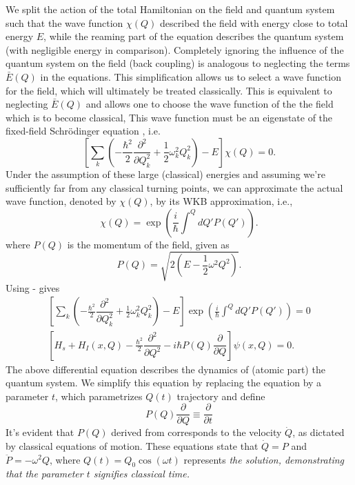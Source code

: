 We split the action of the total Hamiltonian on the field and quantum system such that the 
wave function \(\chi(Q)\) described the field with energy close to total energy \(E\), while 
the reaming part of the equation describes the quantum system (with negligible energy in comparison).
Completely ignoring the influence of the quantum system on the field (back coupling) is analogous 
to neglecting the terms \(\bar{E}(Q)\) in the equations. This simplification allows us 
to select a wave function for the field, which will ultimately be treated classically. 
This is equivalent to neglecting \(\bar{E}(Q)\) and allows one to choose the wave function of the
the field which is to become classical, This wave function must be an eigenstate of the fixed-field Schrödinger equation
, i.e.
\begin{equation}
    \label{eq:class_jcm_eq10}
    \left[\sum_k \left(-\frac{\hbar^2}{2}\dfrac{\partial^2}{\partial Q_k^2}
    + \frac{1}{2} \omega_k^2 Q_k^2\right)
    - E \right]\chi(Q) = 0.
\end{equation}
Under the assumption of these large (classical) energies and assuming we're sufficiently far from any 
classical turning points, we can approximate the actual wave function, denoted by $\chi(Q)$,
 by its WKB approximation, i.e., 
 \begin{equation}
    \label{eq:class_jcm_eq11}
    \chi(Q) = \exp\left(\frac{i}{\hbar}\int ^Q dQ' P(Q')\right).
 \end{equation}
where \(P(Q)\) is the momentum of the field, given as 
\begin{equation}
    \label{eq:class_jcm_eq12}
    P(Q) = \sqrt{2\left(E - \frac{1}{2}\omega^2 Q^2\right)}.
\end{equation}
Using  -  gives
\begin{eqnarray}
    \label{eq:class_jcm_eq13}
    \left[\sum_k \left(-\frac{\hbar^2}{2}\dfrac{\partial^2}{\partial Q_k^2}
    + \frac{1}{2} \omega_k^2 Q_k^2\right)
    - E \right]\exp\left(\frac{i}{\hbar}\int ^Q dQ' P(Q')\right) = 0 \nonumber \\
    \left[
        H_s + H_I(x, Q) - \frac{\hbar^2}{2} \dfrac{\partial^2}{\partial Q^2}
    - i\hbar P(Q) \dfrac{\partial}{\partial Q}\right] \psi(x, Q) = 0. 
\end{eqnarray}
The above differential equation describes the dynamics of (atomic part) 
the quantum system. We simplify this equation by replacing the equation by a parameter $t$, 
which parametrizes $Q(t)$ trajectory and define
\begin{equation}
    \label{eq:class_jcm_eq14}
    P(Q)\dfrac{\partial}{\partial Q} \equiv \dfrac{\partial }{\partial t}
\end{equation}
It's evident that $P(Q)$ derived from  corresponds to the velocity 
$\dot{Q}$, as dictated by classical equations of motion. These equations state that
$\dot{Q} = P$ and $\ddot{P} = -\omega^2 Q$, where $Q(t) = Q_0 \cos(\omega t)$ represents 
\textit{the solution, demonstrating that the parameter $t$ signifies classical time.}

